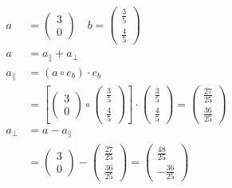 \documentclass[a4paper]{article}
\begin{document}
  \subsection{}
    \begin{align*}
      a &=
      \begin{pmatrix}
        3 \\ 0
      \end{pmatrix}
      \quad
      b =
      \begin{pmatrix}
        \frac{3}{5} \\ \frac{4}{5}
      \end{pmatrix}
      \\[1em]
      a &= a_\parallel + a_\perp
      \\[1em]
      a_\parallel &= (a \circ e_b) \cdot e_b
      \\[1em]
      &= \left[
      \begin{pmatrix}
        3 \\ 0
      \end{pmatrix}
      \circ
      \begin{pmatrix}
        \frac{3}{5} \\ \frac{4}{5}
      \end{pmatrix}
      \right] \cdot
      \begin{pmatrix}
        \frac{3}{5} \\ \frac{4}{5}
      \end{pmatrix}
      =
      \begin{pmatrix}
        \frac{27}{25} \\ \frac{36}{25}
      \end{pmatrix}
      \\[1em]
      a_\perp &= a - a_\parallel
      \\[1em]
      &=
      \begin{pmatrix}
        3 \\ 0
      \end{pmatrix}
      -
      \begin{pmatrix}
        \frac{27}{25} \\ \frac{36}{25}
      \end{pmatrix}
      =
      \begin{pmatrix}
        \frac{48}{25} \\ -\frac{36}{25}
      \end{pmatrix}
    \end{align*}
\end{document}
